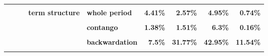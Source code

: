 \documentclass[
  authoryear,
  preprint,
  3p]{elsarticle}
\begin{document}
\begin{landscape}
\begin{longtable}[t]{>{}l>{}l>{}l>{}l>{}l>{}r>{}r>{}r>{}r}
\textbf{\cellcolor{gray!10}{}} & \textbf{\cellcolor{gray!10}{}} & \textbf{\cellcolor{gray!10}{}} & \textbf{\cellcolor{gray!10}{}} & \textbf{\cellcolor{gray!10}{contango}} & \textcolor[HTML]{4285f4}{\textbf{\cellcolor{gray!10}{47.85\%}}} & \textcolor[HTML]{4285f4}{\textbf{\cellcolor{gray!10}{43.02\%}}} & \textcolor[HTML]{4285f4}{\textbf{\cellcolor{gray!10}{26.44\%}}} & \textcolor[HTML]{4285f4}{\textbf{\cellcolor{gray!10}{37.7\%}}}\\
\addlinespace
\textbf{} & \textbf{} & \textbf{} & \textbf{term structure} & \textbf{whole period} & \textcolor[HTML]{4285f4}{\textbf{4.41\%}} & \textcolor[HTML]{4285f4}{\textbf{2.57\%}} & \textcolor[HTML]{4285f4}{\textbf{4.95\%}} & \textcolor[HTML]{4285f4}{\textbf{0.74\%}}\\
\textbf{\cellcolor{gray!10}{}} & \textbf{\cellcolor{gray!10}{}} & \textbf{\cellcolor{gray!10}{}} & \textbf{\cellcolor{gray!10}{}} & \textbf{\cellcolor{gray!10}{backwardation}} & \textcolor[HTML]{4285f4}{\textbf{\cellcolor{gray!10}{9.74\%}}} & \textcolor[HTML]{4285f4}{\textbf{\cellcolor{gray!10}{4.32\%}}} & \textcolor[HTML]{4285f4}{\textbf{\cellcolor{gray!10}{2.68\%}}} & \textcolor[HTML]{4285f4}{\textbf{\cellcolor{gray!10}{2.56\%}}}\\
\textbf{} & \textbf{} & \textbf{} & \textbf{} & \textbf{contango} & \textcolor[HTML]{4285f4}{\textbf{1.38\%}} & \textcolor[HTML]{4285f4}{\textbf{1.51\%}} & \textcolor[HTML]{4285f4}{\textbf{6.3\%}} & \textcolor[HTML]{4285f4}{\textbf{0.16\%}}\\
\textbf{\cellcolor{gray!10}{}} & \textbf{\cellcolor{gray!10}{metals}} & \textbf{\cellcolor{gray!10}{all}} & \textbf{\cellcolor{gray!10}{market}} & \textbf{\cellcolor{gray!10}{whole period}} & \textcolor[HTML]{4285f4}{\textbf{\cellcolor{gray!10}{7.54\%}}} & \textcolor[HTML]{4285f4}{\textbf{\cellcolor{gray!10}{30.79\%}}} & \textcolor[HTML]{4285f4}{\textbf{\cellcolor{gray!10}{38.2\%}}} & \textcolor[HTML]{4285f4}{\textbf{\cellcolor{gray!10}{18.58\%}}}\\
\textbf{} & \textbf{} & \textbf{} & \textbf{} & \textbf{backwardation} & \textcolor[HTML]{4285f4}{\textbf{7.5\%}} & \textcolor[HTML]{4285f4}{\textbf{31.77\%}} & \textcolor[HTML]{4285f4}{\textbf{42.95\%}} & \textcolor[HTML]{4285f4}{\textbf{11.54\%}}\\
\addlinespace
\textbf{\cellcolor{gray!10}{}} & \textbf{\cellcolor{gray!10}{}} & \textbf{\cellcolor{gray!10}{}} & \textbf{\cellcolor{gray!10}{}} & \textbf{\cellcolor{gray!10}{contango}} & \textcolor[HTML]{4285f4}{\textbf{\cellcolor{gray!10}{7.63\%}}} & \textcolor[HTML]{4285f4}{\textbf{\cellcolor{gray!10}{30.19\%}}} & \textcolor[HTML]{4285f4}{\textbf{\cellcolor{gray!10}{36.15\%}}} & \textcolor[HTML]{4285f4}{\textbf{\cellcolor{gray!10}{23\%}}}\\

\end{longtable}
\end{landscape}
\end{document}
